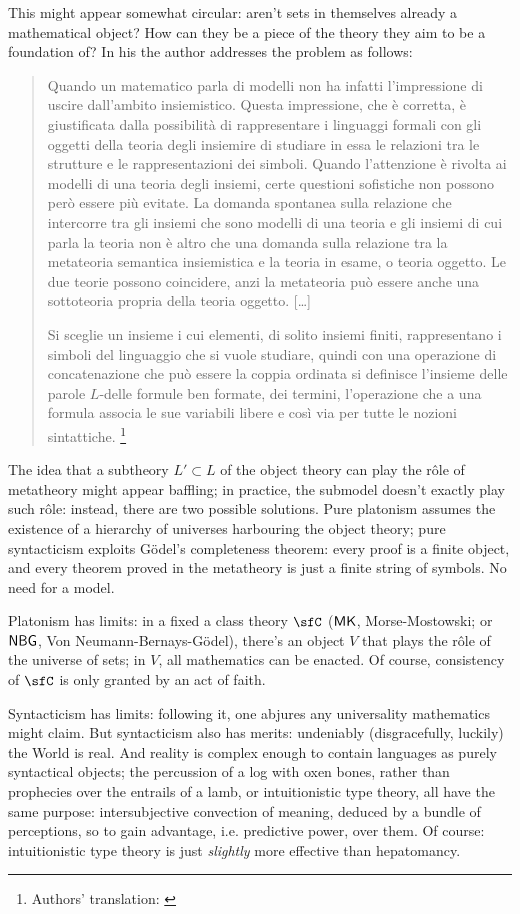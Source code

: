 This might appear somewhat circular: aren't sets in themselves already a mathematical object? How can they be a piece of the theory they aim to be a foundation of? In his \cite{lolli1977categorie} the author addresses the problem as follows:
\begin{quote}
	Quando un matematico parla di modelli non ha infatti l'impressione di uscire dall'ambito insiemistico. Questa impressione, che è corretta, è giustificata dalla possibilità di rappresentare i linguaggi formali con gli oggetti della teoria degli insiemire di studiare in essa le relazioni tra le strutture e le rappresentazioni dei simboli. Quando l'attenzione è rivolta ai modelli di una teoria degli insiemi, certe questioni sofistiche non possono però essere più evitate. La domanda spontanea sulla relazione che intercorre tra gli insiemi che so­no modelli di una teoria e gli insiemi di cui parla la teoria non è altro che una domanda sulla relazione tra la metateoria semantica insiemi­stica e la teoria in esame, o teoria oggetto. Le due teorie possono coincidere, anzi la metateoria può essere anche una sottoteoria pro­pria della teoria oggetto. [\dots\unkern]
	
	Si sceglie un insieme i cui elementi, di solito insiemi finiti, rappresentano i simboli del linguaggio che si vuole studiare, quindi con una operazione di concatenazione che può essere la coppia ordinata si definisce l'insieme delle parole $L$-delle for­mule ben formate, dei termini, l'operazione che a una formula asso­cia le sue variabili libere e così via per tutte le nozioni sintattiche.
\footnote{Authors' translation: \emph{}}
\end{quote}
The idea that a subtheory $L'\subset L$ of the object theory can play the r\^ole of metatheory might appear baffling; in practice, the submodel doesn't exactly play such r\^ole: instead, there are two possible solutions. Pure platonism assumes the existence of a hierarchy of universes harbouring the object theory; pure syntacticism exploits G\"odel's completeness theorem: every proof is a finite object, and every theorem proved in the metatheory is just a finite string of symbols. No need for a model.

Platonism has limits: in a fixed a class theory $\sfC$ ($\sf MK$, Morse-Mostowski; or $\sf NBG$, Von Neumann-Bernays-G\"odel), there's an object $V$ that plays the r\^ole of the universe of sets; in $V$, all mathematics can be enacted. Of course, consistency of $\sfC$ is only granted by an act of faith.

Syntacticism has limits: following it, one abjures any universality mathematics might claim. But syntacticism also has merits: undeniably (disgracefully, luckily) the World is real. And reality is complex enough to contain languages as purely syntactical objects; the percussion of a log with oxen bones, rather than prophecies over the entrails of a lamb, or intuitionistic type theory, all have the same purpose: intersubjective convection of meaning, deduced by a bundle of perceptions, so to gain advantage, i.e. predictive power, over them. Of course: intuitionistic type theory is just \emph{slightly} more effective than hepatomancy.

